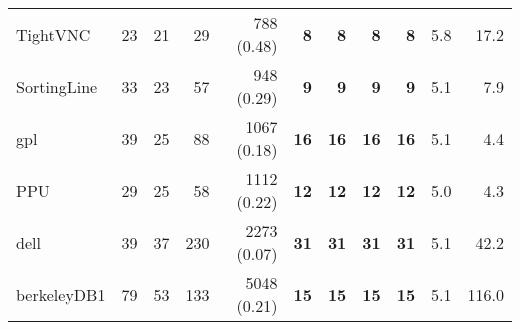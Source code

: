 \begin{table*}
\begin{tiny}
{\begin{tabular}{lrrrrrrrrrr}
TightVNC & \num[text-series-to-math=true]{23} & \num[text-series-to-math=true]{21} & \num[text-series-to-math=true]{29} & \num[text-series-to-math=true]{788} (\num[text-series-to-math=true]{0.48}) & \textbf{\num[text-series-to-math=true]{8}} & \textbf{\num[text-series-to-math=true]{8}} & \textbf{\num[text-series-to-math=true]{8}} & \textbf{\num[text-series-to-math=true]{8}} & 5.8 & 17.2\\
SortingLine & \num[text-series-to-math=true]{33} & \num[text-series-to-math=true]{23} & \num[text-series-to-math=true]{57} & \num[text-series-to-math=true]{948} (\num[text-series-to-math=true]{0.29}) & \textbf{\num[text-series-to-math=true]{9}} & \textbf{\num[text-series-to-math=true]{9}} & \textbf{\num[text-series-to-math=true]{9}} & \textbf{\num[text-series-to-math=true]{9}} & 5.1 & 7.9\\
gpl & \num[text-series-to-math=true]{39} & \num[text-series-to-math=true]{25} & \num[text-series-to-math=true]{88} & \num[text-series-to-math=true]{1067} (\num[text-series-to-math=true]{0.18}) & \textbf{\num[text-series-to-math=true]{16}} & \textbf{\num[text-series-to-math=true]{16}} & \textbf{\num[text-series-to-math=true]{16}} & \textbf{\num[text-series-to-math=true]{16}} & 5.1 & 4.4\\
PPU & \num[text-series-to-math=true]{29} & \num[text-series-to-math=true]{25} & \num[text-series-to-math=true]{58} & \num[text-series-to-math=true]{1112} (\num[text-series-to-math=true]{0.22}) & \textbf{\num[text-series-to-math=true]{12}} & \textbf{\num[text-series-to-math=true]{12}} & \textbf{\num[text-series-to-math=true]{12}} & \textbf{\num[text-series-to-math=true]{12}} & 5.0 & 4.3\\
dell & \num[text-series-to-math=true]{39} & \num[text-series-to-math=true]{37} & \num[text-series-to-math=true]{230} & \num[text-series-to-math=true]{2273} (\num[text-series-to-math=true]{0.07}) & \textbf{\num[text-series-to-math=true]{31}} & \textbf{\num[text-series-to-math=true]{31}} & \textbf{\num[text-series-to-math=true]{31}} & \textbf{\num[text-series-to-math=true]{31}} & 5.1 & 42.2\\
berkeleyDB1 & \num[text-series-to-math=true]{79} & \num[text-series-to-math=true]{53} & \num[text-series-to-math=true]{133} & \num[text-series-to-math=true]{5048} (\num[text-series-to-math=true]{0.21}) & \textbf{\num[text-series-to-math=true]{15}} & \textbf{\num[text-series-to-math=true]{15}} & \textbf{\num[text-series-to-math=true]{15}} & \textbf{\num[text-series-to-math=true]{15}} & 5.1 & 116.0\\

\end{tabular}}
\end{tiny}
\end{table*}
